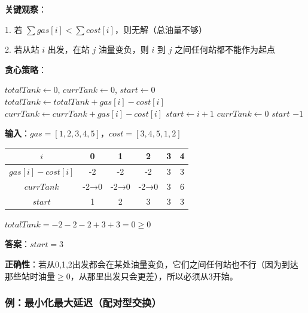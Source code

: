 \documentclass[12pt, a4paper]{ctexart}
\begin{document}
\begin{blackboard}[加油站贪心算法]

\textbf{关键观察}：

1. 若 $\sum gas[i] < \sum cost[i]$，则无解（总油量不够）

2. 若从站 $i$ 出发，在站 $j$ 油量变负，则 $i$ 到 $j$ 之间任何站都不能作为起点

\textbf{贪心策略}：
\begin{algorithmic}[1]
\STATE $totalTank \gets 0$, $currTank \gets 0$, $start \gets 0$
    \STATE $totalTank \gets totalTank + gas[i] - cost[i]$
    \STATE $currTank \gets currTank + gas[i] - cost[i]$
        \STATE $start \gets i + 1$ 
        \STATE $currTank \gets 0$
    \ENDIF
\ENDFOR
{}
    \RETURN $start$
\ELSE
    \RETURN $-1$
\ENDIF
\end{algorithmic}

\end{blackboard}

\begin{blackboard}[加油站手算]

\textbf{输入}：$gas = [1, 2, 3, 4, 5]$，$cost = [3, 4, 5, 1, 2]$

\begin{center}
\begin{tabular}{c|ccccc}
$i$ & 0 & 1 & 2 & 3 & 4 \\
\hline
$gas[i] - cost[i]$ & -2 & -2 & -2 & 3 & 3 \\
$currTank$ & -2→0 & -2→0 & -2→0 & 3 & 6 \\
$start$ & 1 & 2 & 3 & 3 & 3 \\
\end{tabular}
\end{center}

$totalTank = -2-2-2+3+3 = 0 \geq 0$

\textbf{答案}：$start = 3$

\textbf{正确性}：若从0,1,2出发都会在某处油量变负，它们之间任何站也不行（因为到达那些站时油量$\geq 0$，从那里出发只会更差），所以必须从3开始。

\end{blackboard}

\subsubsection{例：最小化最大延迟（配对型交换）}
\end{document}
